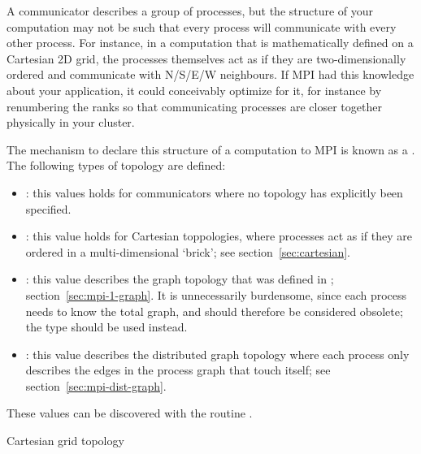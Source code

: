 
A communicator describes a group of processes, but the structure of
your computation may not be such that every process will communicate
with every other process. For instance, in a computation that is
mathematically defined on a
Cartesian 2D grid, the
processes themselves act as if they are two-dimensionally ordered and communicate
with N/S/E/W neighbours. If MPI had this knowledge about your
application, it could conceivably optimize for it, for instance by
renumbering the ranks so that communicating processes are closer
together physically in your cluster.

The mechanism to declare this structure of a computation to MPI
is known as a . The following types of
topology are defined:
\begin{itemize}
\item {}: this values holds for communicators where no
  topology has explicitly been specified.
\item {}: this value holds for Cartesian
  toppologies, where processes act as if they are ordered in a
  multi-dimensional `brick'; see
  section~\ref{sec:cartesian}.
\item {}: this value describes the graph
  topology that was defined in ;
  section~\ref{sec:mpi-1-graph}. It is unnecessarily burdensome, since
  each process needs to know the total graph, and should therefore be
  considered obsolete; the type  should
  be used instead.
\item {}: this value describes the distributed graph
  topology where each process only describes the edges in the process
  graph that touch itself; see section~\ref{sec:mpi-dist-graph}.
\end{itemize}
These values can be discovered with the routine
.
%

 {Cartesian grid topology}
\label{sec:cartesian}

